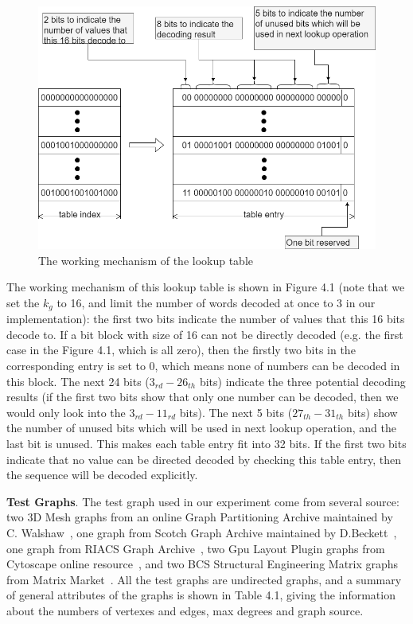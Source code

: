 \documentclass[12pt,glossary]{dalthesis}
\begin{document}
\begin{figure}[ht]
\centering
\includegraphics[width=1.0\textwidth]{Decoding}
\caption{The working mechanism of the lookup table}
\end{figure}

\bigskip

The working mechanism of this lookup table is shown in Figure 4.1 (note that we set the $k_{g}$ to 16, and limit the number of words decoded at once to 3 in our implementation): the first two bits indicate the number of values that this 16 bits decode to. If a bit block with size of 16 can not be directly decoded (e.g. the first case in the Figure 4.1, which is all zero), then the firstly two bits in the corresponding entry is set to 0, which means none of numbers can be decoded in this block. The next 24 bits ($3_{rd} - 26_{th}$ bits) indicate the three potential decoding results (if the first two bits show that only one number can be decoded, then we would only look into the $3_{rd} - 11_{rd}$ bits). The next 5 bits ($27_{th} - 31_{th}$ bits) show the number of unused bits which will be used in next lookup operation, and the last bit is unused. This makes each table entry fit into 32 bits. If the first two bits indicate that no value can be directed decoded by checking this table entry, then the sequence will be decoded explicitly.

\textbf{Test Graphs}. The test graph used in our experiment come from several source: two 3D Mesh graphs from an online Graph Partitioning Archive maintained by C. Walshaw~\cite{3DMESH}, one graph from Scotch Graph Archive maintained by D.Beckett~\cite{Scotch}, one graph from RIACS Graph Archive~\cite{RIACS}, two Gpu Layout Plugin graphs from Cytoscape online resource~\cite{Cytoscape}, and two BCS Structural Engineering Matrix graphs from Matrix Market~\cite{Matrix}. All the test graphs are undirected graphs, and a summary of general attributes of the graphs is shown in Table 4.1, giving the information about the numbers of vertexes and edges, max degrees and graph source.
\end{document}
